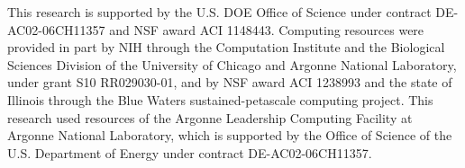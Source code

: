 \documentclass[conference,10pt]{IEEEtran}
\begin{document}
This research is supported by the U.S. DOE Office of Science under
contract DE-AC02-06CH11357 and NSF award ACI 1148443.  Computing
resources were provided in part by NIH through the Computation
Institute and the Biological Sciences Division of the University of
Chicago and Argonne National Laboratory, under grant S10 RR029030-01,
and by NSF award ACI 1238993 and the state of Illinois through the
Blue Waters sustained-petascale computing project. This research used
resources of the Argonne Leadership Computing Facility at Argonne
National Laboratory, which is supported by the Office of Science of
the U.S. Department of Energy under contract DE-AC02-06CH11357.




\begin{comment}

\vspace{1cm}

\noindent
(The following paragraph will be removed from the final version.)

\vspace{0.5cm}

\noindent
This manuscript was created by UChicago Argonne, LLC, Operator of 
Argonne National Laboratory (``Argonne''). Argonne, a U.S. Department
of Energy Office of Science laboratory, is operated under Contract
DE-AC02-06CH11357.  The U.S. Government retains for itself, and others
acting on its behalf, a paid-up nonexclusive, irrevocable worldwide
license in said article to reproduce, prepare derivative works,
distribute copies to the public, and perform publicly and display
publicly, by or on behalf of the Government.

\end{comment}
\end{document}

